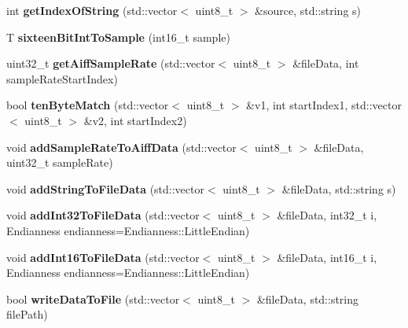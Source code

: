 \begin{DoxyCompactItemize}
\item 
\hypertarget{class_audio_file_a7446935a450d4aa8da37e5ac1fd4133b}{int {\bfseries get\-Index\-Of\-String} (std\-::vector$<$ uint8\-\_\-t $>$ \&source, std\-::string s)}\label{class_audio_file_a7446935a450d4aa8da37e5ac1fd4133b}

\item 
\hypertarget{class_audio_file_a2ff18ea40f28f1758f0ca78b2185c789}{T {\bfseries sixteen\-Bit\-Int\-To\-Sample} (int16\-\_\-t sample)}\label{class_audio_file_a2ff18ea40f28f1758f0ca78b2185c789}

\item 
\hypertarget{class_audio_file_afd351555e7868d1c9cbf77d93edc09dd}{uint32\-\_\-t {\bfseries get\-Aiff\-Sample\-Rate} (std\-::vector$<$ uint8\-\_\-t $>$ \&file\-Data, int sample\-Rate\-Start\-Index)}\label{class_audio_file_afd351555e7868d1c9cbf77d93edc09dd}

\item 
\hypertarget{class_audio_file_a801f2c42d590c1fcba274c6d1f70cfbc}{bool {\bfseries ten\-Byte\-Match} (std\-::vector$<$ uint8\-\_\-t $>$ \&v1, int start\-Index1, std\-::vector$<$ uint8\-\_\-t $>$ \&v2, int start\-Index2)}\label{class_audio_file_a801f2c42d590c1fcba274c6d1f70cfbc}

\item 
\hypertarget{class_audio_file_aa25ff369a0e2ca315c7abf3982ef1c18}{void {\bfseries add\-Sample\-Rate\-To\-Aiff\-Data} (std\-::vector$<$ uint8\-\_\-t $>$ \&file\-Data, uint32\-\_\-t sample\-Rate)}\label{class_audio_file_aa25ff369a0e2ca315c7abf3982ef1c18}

\item 
\hypertarget{class_audio_file_a21b500e75c67e28f38554c2eb752e24b}{void {\bfseries add\-String\-To\-File\-Data} (std\-::vector$<$ uint8\-\_\-t $>$ \&file\-Data, std\-::string s)}\label{class_audio_file_a21b500e75c67e28f38554c2eb752e24b}

\item 
\hypertarget{class_audio_file_add8628d661b806fbba0e28231da97563}{void {\bfseries add\-Int32\-To\-File\-Data} (std\-::vector$<$ uint8\-\_\-t $>$ \&file\-Data, int32\-\_\-t i, Endianness endianness=Endianness\-::\-Little\-Endian)}\label{class_audio_file_add8628d661b806fbba0e28231da97563}

\item 
\hypertarget{class_audio_file_aba8b98835fdc51bc9d0e04634c70603a}{void {\bfseries add\-Int16\-To\-File\-Data} (std\-::vector$<$ uint8\-\_\-t $>$ \&file\-Data, int16\-\_\-t i, Endianness endianness=Endianness\-::\-Little\-Endian)}\label{class_audio_file_aba8b98835fdc51bc9d0e04634c70603a}

\item 
\hypertarget{class_audio_file_a734c540c871a3843f01f908bbfc3962d}{bool {\bfseries write\-Data\-To\-File} (std\-::vector$<$ uint8\-\_\-t $>$ \&file\-Data, std\-::string file\-Path)}\label{class_audio_file_a734c540c871a3843f01f908bbfc3962d}

\end{DoxyCompactItemize}
